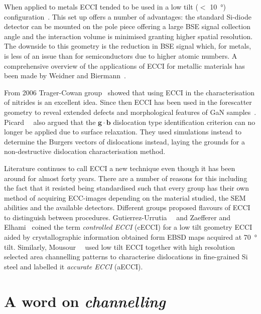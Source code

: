 When applied to metals ECCI tended to be used in a low tilt ($<$ \SI{10}{\degree}) configuration~\cite{Simkin99}. This set up offers a number of advantages: the standard Si-diode detector can be mounted on the pole piece offering a large BSE signal collection angle and the interaction volume is minimised granting higher spatial resolution. The downside to this geometry is the reduction in BSE signal which, for metals, is less of an issue than for semiconductors due to higher atomic numbers. A comprehensive overview of the applications of ECCI for metallic materials has been made by Weidner and Biermann~\cite{Weidner15}.

From 2006 Trager-Cowan group~\cite{Trager06} showed that using ECCI in the characterisation of nitrides is an excellent idea. Since then ECCI has been used in the forescatter geometry to reveal extended defects and
morphological features of GaN samples~\cite{Picard}. Picard~\etal~\cite{Picard09} also argued that the $\mathbf{g}\cdot\mathbf{b}$ dislocation type identification criterion can no longer be applied due to surface relaxation. They used simulations instead to determine the Burgers vectors of dislocations instead, laying the grounds for a non-destructive dislocation characterisation method. 

Literature continues to call ECCI a new technique even though it has been around for almost forty years. There are a number of reasons for this including the fact that it resisted being standardised such that every group has their own method of acquiring ECC-images depending on the material studied, the SEM abilities and the available detectors. Different groups proposed flavours of ECCI to distinguish between procedures. Gutierrez-Urrutia~\etal~\cite{Gutierrez09} and Zaefferer and Elhami~\cite{Zaefferer14} coined the term \textit{controlled ECCI} (cECCI) for a low tilt geometry ECCI aided by crystallographic information obtained form EBSD maps acquired at \SI{70}{\degree} tilt. Similarly, Mousour~\etal~\cite{Mansour15} used low tilt ECCI together with high resolution selected area channelling patterns to characterise dislocations in fine-grained Si steel and labelled it \textit{accurate ECCI} (aECCI). 

\section{A word on \textit{channelling}}
\label{sec:channelling}



